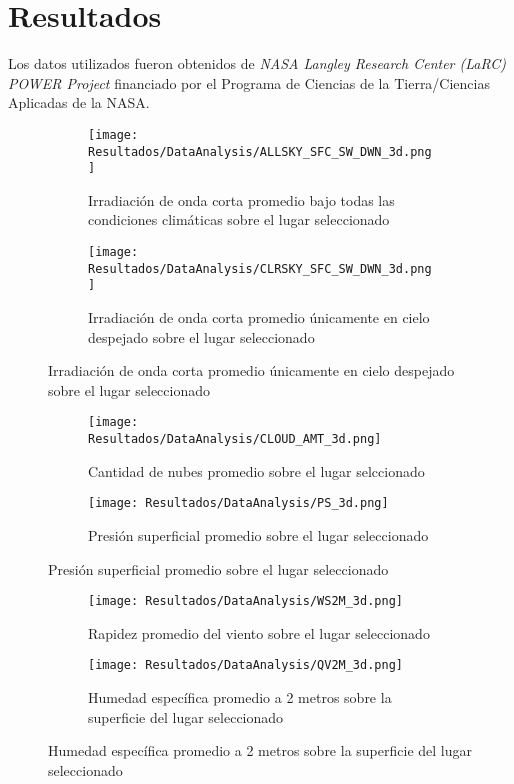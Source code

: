 \chapter{Resultados}
	
	Los datos utilizados fueron obtenidos de \textit{NASA Langley Research Center (LaRC) POWER Project} financiado por el Programa de Ciencias de la Tierra/Ciencias Aplicadas de la NASA.
	
	\begin{figure}[H]
		\centering
		\begin{subfigure}[t]{0.45\linewidth}
			\centering
			\texttt{[image: Resultados/DataAnalysis/ALLSKY\_SFC\_SW\_DWN\_3d.png]}
			\caption{Irradiación de onda corta promedio bajo todas las condiciones climáticas sobre el lugar seleccionado}
			\label{fig:ALLSKY_SFC_SW_DWN_3d}
		\end{subfigure}
		\hfill
		\begin{subfigure}[t]{0.45\linewidth}
			\centering
			\texttt{[image: Resultados/DataAnalysis/CLRSKY\_SFC\_SW\_DWN\_3d.png]}
			\caption{Irradiación de onda corta promedio únicamente en cielo despejado sobre el lugar seleccionado}
			\label{fig:CLRSKY_SFC_SW_DWN_3d}
		\end{subfigure}
	\end{figure}
	\begin{figure}[H]\ContinuedFloat
		\begin{subfigure}[t]{0.45\linewidth}
			\centering
			\texttt{[image: Resultados/DataAnalysis/CLOUD\_AMT\_3d.png]}
			\caption{Cantidad de nubes promedio sobre el lugar selccionado}
			\label{fig:CLOUD_AMT_3d}
		\end{subfigure}
		\hfill
		\begin{subfigure}[t]{0.45\linewidth}
			\centering
			\texttt{[image: Resultados/DataAnalysis/PS\_3d.png]}
			\caption{Presión superficial promedio sobre el lugar seleccionado}
			\label{fig:PS_3d}
		\end{subfigure}
	\end{figure}
	\begin{figure}[H]\ContinuedFloat
		\begin{subfigure}[t]{0.45\linewidth}
			\centering
			\texttt{[image: Resultados/DataAnalysis/WS2M\_3d.png]}
			\caption{Rapidez promedio del viento sobre el lugar seleccionado}
			\label{fig:WS2M_3d}
		\end{subfigure}
		\begin{subfigure}[t]{0.45\linewidth}
			\centering
			\texttt{[image: Resultados/DataAnalysis/QV2M\_3d.png]}
			\caption{Humedad específica promedio a 2 metros sobre la superficie del lugar seleccionado}
			\label{fig:QV2M_3d}
		\end{subfigure}
	\end{figure}
